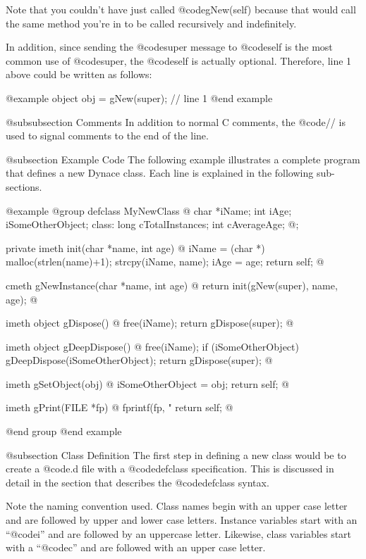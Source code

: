 Note that you couldn't have just called @code{gNew(self)}
because that would call the same method you're in to be called
recursively and indefinitely.

In addition, since sending the @code{super} message to @code{self}
is the most common use of @code{super}, the @code{self} is
actually optional.  Therefore, line 1 above could be written as follows:

@example
        object  obj = gNew(super);  // line 1
@end example


@subsubsection Comments
In addition to normal C comments, the @code{//} is used to signal comments
to the end of the line.


@subsection Example Code
The following example illustrates a complete program that defines a new
Dynace class.  Each line is explained in the following sub-sections.

@example
@group
defclass  MyNewClass  @{
        char    *iName;
        int     iAge;
        iSomeOtherObject;
 class:
        long    cTotalInstances;
        int     cAverageAge;
@};

private imeth init(char *name, int age)
@{
        iName = (char *) malloc(strlen(name)+1);
        strcpy(iName, name);
        iAge = age;
        return self;
@}

cmeth  gNewInstance(char *name, int age)
@{
        return init(gNew(super), name, age);
@}

imeth   object    gDispose()
@{
        free(iName);
        return gDispose(super);
@}

imeth   object   gDeepDispose()
@{
        free(iName);
        if (iSomeOtherObject)
                gDeepDispose(iSomeOtherObject);
        return gDispose(super);
@}

imeth   gSetObject(obj)
@{
        iSomeOtherObject = obj;
        return self;
@}

imeth   gPrint(FILE *fp)
@{
        fprintf(fp, "%
        return self;
@}

@end group
@end example


@subsection Class Definition
The first step in defining a new class would be to create a @code{.d}
file with a @code{defclass} specification.  This is discussed in
detail in the section that describes the @code{defclass} syntax.

Note the naming convention used.  Class names begin with an upper case
letter and are followed by upper and lower case letters.  Instance
variables start with an ``@code{i}'' and are followed by an uppercase
letter.  Likewise, class variables start with a ``@code{c}'' and are
followed with an upper case letter.

